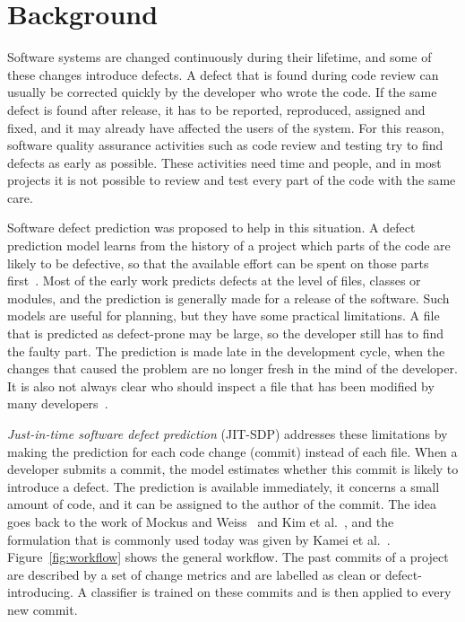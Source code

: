 \documentclass[12pt,a4paper,oneside]{report}
\begin{document}
\section{Background}

Software systems are changed continuously during their lifetime, and some of
these changes introduce defects. A defect that is found during code review can
usually be corrected quickly by the developer who wrote the code. If the same
defect is found after release, it has to be reported, reproduced, assigned and
fixed, and it may already have affected the users of the system. For this
reason, software quality assurance activities such as code review and testing
try to find defects as early as possible. These activities need time and
people, and in most projects it is not possible to review and test every part
of the code with the same care.

Software defect prediction was proposed to help in this situation. A defect
prediction model learns from the history of a project which parts of the code
are likely to be defective, so that the available effort can be spent on those
parts first~\cite{hall2012slr,rathore2019study}. Most of the early work predicts
defects at the level of files, classes or modules, and the prediction is
generally made for a release of the software. Such models are useful for
planning, but they have some practical limitations. A file that is predicted
as defect-prone may be large, so the developer still has to find the faulty
part. The prediction is made late in the development cycle, when the changes
that caused the problem are no longer fresh in the mind of the developer.
It is also not always clear who should inspect a file that has been modified by
many developers~\cite{kamei2013jit}.

\emph{Just-in-time software defect prediction} (JIT-SDP) addresses these
limitations by making the prediction for each code change (commit) instead of
each file. When a developer submits a commit, the model estimates whether this
commit is likely to introduce a defect. The prediction is available
immediately, it concerns a small amount of code, and it can be assigned to the
author of the commit. The idea goes back to the work of Mockus and
Weiss~\cite{mockus2000risk} and Kim et al.~\cite{kim2008classifying}, and the
formulation that is commonly used today was given by Kamei et
al.~\cite{kamei2013jit}. Figure~\ref{fig:workflow} shows the general workflow.
The past commits of a project are described by a set of change metrics and are
labelled as clean or defect-introducing. A classifier is trained on these
commits and is then applied to every new commit.
\end{document}
